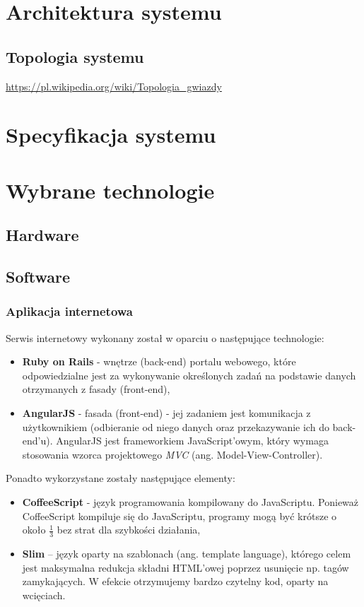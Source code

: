 \documentclass[eng,oneside]{mgr}
\begin{document}
\chapter{Architektura systemu}
\section{Topologia systemu}
\url{https://pl.wikipedia.org/wiki/Topologia_gwiazdy}
\chapter{Specyfikacja systemu}
\chapter{Wybrane technologie}
\section{Hardware}
\section{Software}
\subsection{Aplikacja internetowa}
Serwis internetowy wykonany został w oparciu o następujące technologie:
\begin{itemize}
	\item \textbf{Ruby on Rails} - wnętrze (back-end) portalu webowego, które odpowiedzialne jest za wykonywanie określonych zadań na podstawie danych otrzymanych z fasady (front-end),
	\item \textbf{AngularJS} - fasada (front-end) - jej zadaniem jest komunikacja z użytkownikiem (odbieranie od niego danych oraz przekazywanie ich do back-end'u). AngularJS jest frameworkiem JavaScript'owym, który wymaga stosowania wzorca projektowego \emph{MVC} (ang. Model-View-Controller).
\end{itemize}
Ponadto wykorzystane zostały następujące elementy:
\begin{itemize}
	\item \textbf{CoffeeScript} - język programowania kompilowany do JavaScriptu. Ponieważ CoffeeScript kompiluje się do JavaScriptu, programy mogą być krótsze o około $\frac{1}{3}$ bez strat dla szybkości działania,
	\item \textbf{Slim} – język oparty na szablonach (ang. template language), którego celem jest maksymalna redukcja składni HTML’owej poprzez usunięcie np. tagów zamykających. W efekcie otrzymujemy bardzo czytelny kod, oparty na wcięciach.
\end{itemize}
\end{document}
